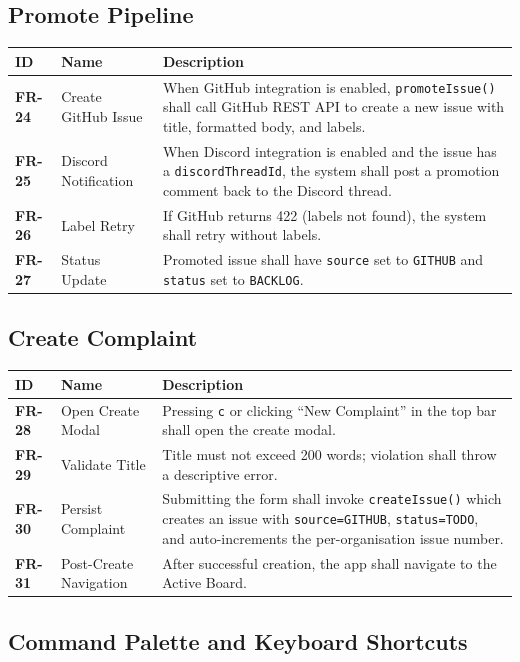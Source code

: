 \documentclass[12pt,a4paper]{report}
\begin{document}
\subsection{Promote Pipeline}

\begin{longtable}{>{\bfseries}p{1.8cm} p{4.5cm} p{6.5cm}}
\toprule
ID & Name & Description \\
\midrule
\endhead
FR-24 & Create GitHub Issue & When GitHub integration is enabled,
  \texttt{promoteIssue()} shall call GitHub REST API to create a new issue with
  title, formatted body, and labels. \\
FR-25 & Discord Notification & When Discord integration is enabled and the
  issue has a \texttt{discordThreadId}, the system shall post a promotion
  comment back to the Discord thread. \\
FR-26 & Label Retry & If GitHub returns 422 (labels not found), the system
  shall retry without labels. \\
FR-27 & Status Update & Promoted issue shall have \texttt{source} set to
  \texttt{GITHUB} and \texttt{status} set to \texttt{BACKLOG}. \\
\bottomrule
\end{longtable}

\subsection{Create Complaint}

\begin{longtable}{>{\bfseries}p{1.8cm} p{4.5cm} p{6.5cm}}
\toprule
ID & Name & Description \\
\midrule
\endhead
FR-28 & Open Create Modal & Pressing \texttt{c} or clicking ``New Complaint''
  in the top bar shall open the create modal. \\
FR-29 & Validate Title & Title must not exceed 200 words; violation shall throw
  a descriptive error. \\
FR-30 & Persist Complaint & Submitting the form shall invoke
  \texttt{createIssue()} which creates an issue with
  \texttt{source=GITHUB}, \texttt{status=TODO}, and auto-increments the
  per-organisation issue number. \\
FR-31 & Post-Create Navigation & After successful creation, the app shall
  navigate to the Active Board. \\
\bottomrule
\end{longtable}

\subsection{Command Palette and Keyboard Shortcuts}
\end{document}
